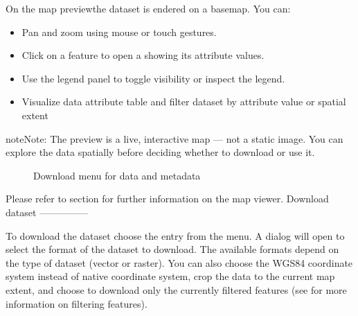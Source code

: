 \documentclass[letterpaper,10pt,english]{sphinxmanual}
\begin{document}
\sphinxAtStartPar
On the map previewthe dataset is endered on a basemap. You can:
\begin{itemize}
\item {} 
\sphinxAtStartPar
Pan and zoom using mouse or touch gestures.

\item {} 
\sphinxAtStartPar
Click on a feature to open a  showing its attribute values.

\item {} 
\sphinxAtStartPar
Use the legend  panel  to toggle visibility or inspect the legend.

\item {} 
\sphinxAtStartPar
Visualize data attribute table and filter dataset by attribute value or spatial extent

\end{itemize}

\begin{sphinxadmonition}{note}{Note:}
\sphinxAtStartPar
The preview is a live, interactive map — not a static image. You can explore the
data spatially before deciding whether to download or use it.
\end{sphinxadmonition}

\begin{figure}[htbp]
\centering
\capstart

\noindent{}
\caption{Download menu for data and metadata}\label{\detokenize{02_find_and_visualize:id17}}\end{figure}

\sphinxAtStartPar
Please refer to {\hyperref[\detokenize{04_exploring_maps:map-viewer}]{}} section for further information on the map viewer.
Download dataset
—————\sphinxhyphen{}

\sphinxAtStartPar
To download the dataset choose the  entry from the  menu.
A dialog will open to select the format of the dataset to download.
The available formats depend on the type of dataset (vector or raster).
You can also choose the WGS84 coordinate system instead of native coordinate system,
crop the data to the current map extent, and choose to download only the currently filtered features
(see {\hyperref[\detokenize{04_exploring_maps:filtering-features}]{}} for more information on filtering features).
\end{document}
